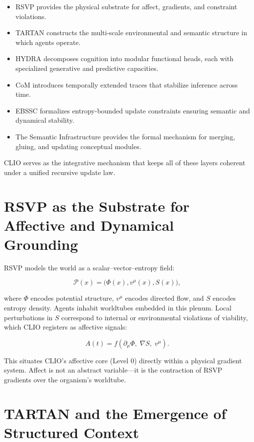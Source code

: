 \documentclass[12pt,oneside]{book}
\theoremstyle{plain}
\theoremstyle{definition}
\begin{document}
\begin{itemize}
    \item RSVP provides the physical substrate for affect, gradients,
    and constraint violations.
    \item TARTAN constructs the multi-scale environmental and semantic
    structure in which agents operate.
    \item HYDRA decomposes cognition into modular functional heads, each with
    specialized generative and predictive capacities.
    \item CoM introduces temporally extended traces that stabilize inference
    across time.
    \item EBSSC formalizes entropy-bounded update constraints ensuring
    semantic and dynamical stability.
    \item The Semantic Infrastructure provides the formal mechanism for
    merging, gluing, and updating conceptual modules.
\end{itemize}

CLIO serves as the integrative mechanism that keeps all of these layers
coherent under a unified recursive update law.

\section{RSVP as the Substrate for Affective and Dynamical Grounding}

RSVP models the world as a scalar--vector--entropy field:

\[
\mathcal{P}(x) = \bigl( \Phi(x), v^\mu(x), S(x) \bigr),
\]

where $\Phi$ encodes potential structure, $v^\mu$ encodes directed flow, and
$S$ encodes entropy density.
Agents inhabit worldtubes embedded in this plenum.
Local perturbations in $S$ correspond to internal or environmental
violations of viability, which CLIO registers as affective signals:

\[
A(t) = f\!\left( \partial_\mu \Phi,\; \nabla S,\; v^\mu \right).
\]

This situates CLIO's affective core (Level 0) directly within a physical
gradient system.
Affect is not an abstract variable—it is the contraction of RSVP gradients
over the organism's worldtube.

\section{TARTAN and the Emergence of Structured Context}
\end{document}
